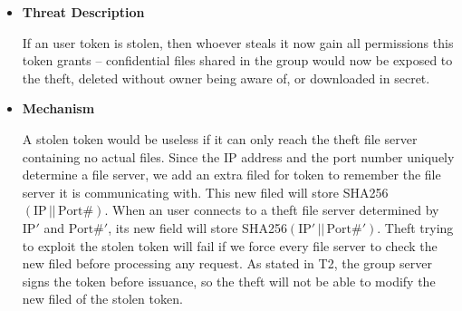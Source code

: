 \documentclass[letterpaper,11pt]{article}
\newlength{\arrow}
\begin{document}
\begin{itemize}[noitemsep,topsep=0pt,parsep=1pt,partopsep=1pt]
	\item\textbf{Threat Description}
	\begin{flushleft}
		If an user token is stolen, then whoever steals it now gain all permissions this token grants -- confidential files shared in the group would now be exposed to the theft, deleted without owner being aware of, or downloaded in secret.
	\end{flushleft}
	\newpage
	\item\textbf{Mechanism}
	\begin{flushleft}
		A stolen token would be useless if it can only reach the theft file server containing no actual files. Since the IP address and the port number uniquely determine a file server, we add an extra filed for token to remember the file server it is communicating with. This new filed will store SHA256$\left(\textrm{IP}\,||\,\textrm{Port\#}\right)$. When an user connects to a theft file server determined by $\textrm{IP}'$ and $\textrm{Port\#}'$, its new field will store SHA256$\left(\textrm{IP}'\,||\,\textrm{Port\#}'\right)$. Theft trying to exploit the stolen token will fail if we force every file server to check the new filed before processing any request. As stated in T2, the group server signs the token before issuance, so the theft will not be able to modify the new filed of the stolen token.
	\end{flushleft}

\end{itemize}
\end{document}
